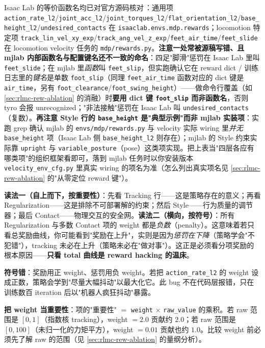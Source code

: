Isaac Lab 的等价函数名均已对官方源码核对\,\cite{isaaclab2024}：通用项 \verb|action_rate_l2|/\verb|joint_acc_l2|/\verb|joint_torques_l2|/\verb|flat_orientation_l2|/\verb|base_height_l2|/\verb|undesired_contacts| 在 \verb|isaaclab.envs.mdp.rewards|；locomotion 特定项 \verb|track_lin_vel_xy_exp|/\verb|track_ang_vel_z_exp|/\verb|feet_air_time|/\verb|feet_slide| 在 locomotion velocity 任务的 \verb|mdp/rewards.py|。\textbf{注意一处常被源稿写错、且 mjlab 内部函数名与配置键名还不一致的命名}：四足"脚滑"惩罚在 Isaac Lab 里叫 \verb|feet_slide|；在 mjlab 里\emph{函数}叫 \verb|feet_slip|，但实跑确认它在 reward dict / 训练日志里的\emph{键名}是单数 \verb|foot_slip|（同理 \verb|feet_air_time| 函数对应的 dict 键是 \verb|air_time|，另有 \verb|foot_clearance|/\verb|foot_swing_height|）——做命令行覆盖（如 \cref{sec:rlmc-rew-ablation} 的消融）时\textbf{要用 dict 键 \texttt{foot\_slip} 而非函数名}，否则 tyro 会报 unrecognized；"非法接触"惩罚在 Isaac Lab 叫 \verb|undesired_contacts|（复数）。\textbf{再注意 Style 行的 \texttt{base\_height} 是"典型示例"而非 mjlab 实装项}：实跑 grep 确认 mjlab 的 \verb|envs/mdp/rewards.py| 与 velocity 实际 wiring 里\emph{并无} \verb|base_height| 项（Isaac Lab 侧 \verb|base_height_l2| 则存在）；mjlab 的 Style 约束实际靠 \verb|upright| 与 \verb|variable_posture|（pose）这类项实现。把上表当"四层各应有哪类项"的组织框架看即可，落到 mjlab 任务时以你安装版本 \verb|velocity_env_cfg.py| 里真实 wiring 的项名为准（怎么列出真实项名见 \cref{sec:rlmc-rew-ablation} 的"从零定位 reward 键"）。

\begin{insight}\label{ins:rlmc-rew-tworead}
\textbf{读法一（自上而下，按重要性）}：先看 Tracking 行——这是策略存在的意义；再看 Regularization——这是排除不可部署解的约束；然后 Style——行为质量的调节器；最后 Contact——物理交互的安全网。\textbf{读法二（横向，按符号）}：所有 Regularization 与多数 Contact 项的 weight 都是\emph{负数}（penalty）。这意味着若只看总奖励曲线，你可能看到"奖励在上升"，实则是因为\emph{惩罚在下降}（策略学会"不犯错"），tracking 未必在上升（策略未必在"做对事"）。这正是必须看分项奖励的根本原因——\textbf{只看 total 曲线是 reward hacking 的温床}。
\end{insight}

\begin{pitfall}[两个最常见的配置错误]
\textbf{符号错}：奖励用正 weight、惩罚用负 weight。若把 \verb|action_rate_l2| 的 weight 设成正数，策略会学到"尽量大幅抖动"以最大化它。此 bug 不在代码层报错，只在训练数百 iteration 后以"机器人疯狂抖动"暴露。

\textbf{把 weight 当重要性}：项的"重要性" $=$ \verb|weight| $\times$ \verb|raw_value| 的乘积。若 raw 范围是 $[0,1]$（指数核 tracking），weight $=2.0$ 贡献约 $2.0$；若 raw 范围是 $[0,100]$（未归一化的力矩平方），weight $=0.01$ 贡献也约 $1.0$。比较 weight 前必须先了解 raw 的范围（见 \cref{sec:rlmc-rew-ablation} 的量纲分析）。
\end{pitfall}

